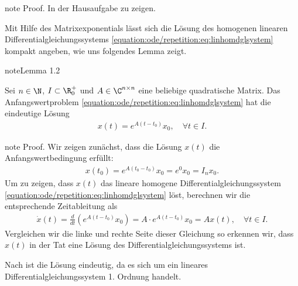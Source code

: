 \documentclass[letterpaper,10pt,english]{jupyterBook}
\begin{document}
\begin{sphinxadmonition}{note}
\sphinxAtStartPar
Proof. In der Hausaufgabe zu zeigen.
\end{sphinxadmonition}

\sphinxAtStartPar
Mit Hilfe des Matrixexponentials lässt sich die Lösung des homogenen linearen Differentialgleichungssystems \eqref{equation:ode/repetition:eq:linhomdglsystem} kompakt angeben, wie uns folgendes Lemma zeigt.
\label{ode/repetition:lemma-15}
\begin{sphinxadmonition}{note}{Lemma 1.2}



\sphinxAtStartPar
Sei \(n\in \N\), \(I \subset \R^+_0\) und \(A \in \C^{n\times n}\) eine beliebige quadratische Matrix.
Das Anfangswertproblem \eqref{equation:ode/repetition:eq:linhomdglsystem} hat die eindeutige Lösung
\begin{equation*}
\begin{split}x(t) = e^{A(t-t_0)}x_0, \quad \forall t \in I.\end{split}
\end{equation*}\end{sphinxadmonition}

\begin{sphinxadmonition}{note}
\sphinxAtStartPar
Proof. Wir zeigen zunächst, dass die Lösung \(x(t)\) die Anfangswertbedingung erfüllt:
\begin{equation*}
\begin{split}x(t_0) = e^{A(t_0-t_0)}x_0 = e^0x_0 = I_n x_0.\end{split}
\end{equation*}
\sphinxAtStartPar
Um zu zeigen, dass \(x(t)\) das lineare homogene Differentialgleichungssystem \eqref{equation:ode/repetition:eq:linhomdglsystem} löst, berechnen wir die entsprechende Zeitableitung als
\begin{equation*}
\begin{split}\dot{x}(t) = \frac{d}{dt}(e^{A(t-t_0)}x_0) = A \cdot e^{A(t-t_0)}x_0 = A x(t), \quad \forall t \in I.\end{split}
\end{equation*}
\sphinxAtStartPar
Vergleichen wir die linke und rechte Seite dieser Gleichung so erkennen wir, dass \(x(t)\) in der Tat eine Lösung des Differentialgleichungssystems ist.

\sphinxAtStartPar
Nach {\hyperref[\detokenize{ode/repetition:cor:eindeutigkeitlinear}]{}} ist die Lösung eindeutig, da es sich um ein lineares Differentialgleichungssystem 1. Ordnung handelt.
\end{sphinxadmonition}
\end{document}
